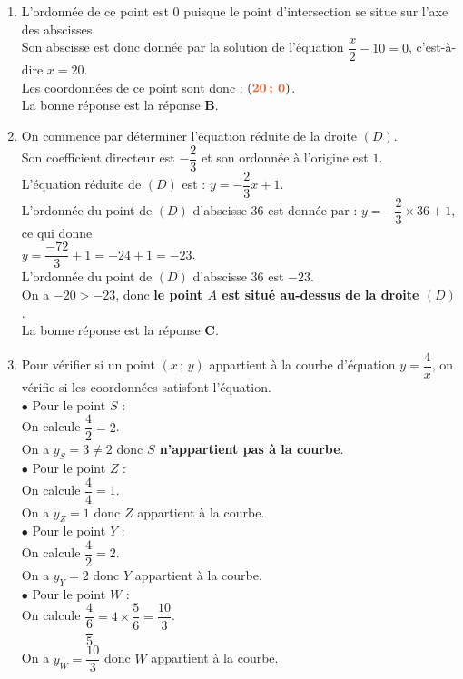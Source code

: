 \documentclass[a4paper,11pt]{article}
\newcounter{seancenum}
\newcounter{seancenumD}
\begin{document}
\setcounter{seancenumD}{29}
\newpage
\begin{seanceD}{} %

\begin{enumerate}
\item L'ordonnée de ce point est $0$ puisque le point d'intersection se situe sur l'axe des abscisses.\\
      Son abscisse est donc donnée par la solution de l'équation  $\dfrac{x}{2}-10=0$, c'est-à-dire $x=20$.
    \\Les coordonnées de ce   point sont donc : $({\color[HTML]{F15929}\boldsymbol{20\,;\,0}})$.\\La bonne réponse est la réponse {\bfseries \color[HTML]{F15929}B}.

\item On commence par déterminer l'équation réduite de la droite $(D)$.\\
    Son coefficient directeur est $-\dfrac{2}{3}$ et son ordonnée à l'origine est $1$.\\
    L'équation réduite de $(D)$ est : $y=-\dfrac{2}{3}x+1$.\\
    L'ordonnée du point de $(D)$ d'abscisse $36$ est donnée par : $y=-\dfrac{2}{3}\times 36+1$, ce qui donne\\
    $y=\dfrac{-72}{3}+1=-24+1=-23$.\\
    L'ordonnée du point de $(D)$ d'abscisse $36$ est $-23$.\\On a $-20>-23$, donc {\bfseries \color[HTML]{F15929}le point $A$ est situé au-dessus de la droite $(D)$}.\\La bonne réponse est la réponse {\bfseries \color[HTML]{F15929}C}.

\item Pour vérifier si un point $(x\,;\,y)$ appartient à la courbe d'équation $y=\dfrac{4}{x}$, on vérifie si les coordonnées satisfont l'équation.\\$\bullet$ Pour le point $S$ :\\On calcule $\dfrac{4}{2}=2$.\\On a $y_{S}=3\neq 2$ donc {\bfseries \color[HTML]{F15929}$S$ n'appartient pas à la courbe}.\\$\bullet$ Pour le point $Z$ :\\On calcule $\dfrac{4}{4}=1$.\\On a $y_{Z}=1$ donc $Z$ appartient à la courbe.\\$\bullet$ Pour le point $Y$ :\\On calcule $\dfrac{4}{2}=2$.\\On a $y_{Y}=2$ donc $Y$ appartient à la courbe.\\$\bullet$ Pour le point $W$ :\\On calcule $\dfrac{4}{\dfrac{6}{5}}=4\times \dfrac{5}{6}=\dfrac{10}{3}$.\\On a $y_{W}=\dfrac{10}{3}$ donc $W$ appartient à la courbe.


\end{enumerate}
\end{seanceD}
\end{document}
